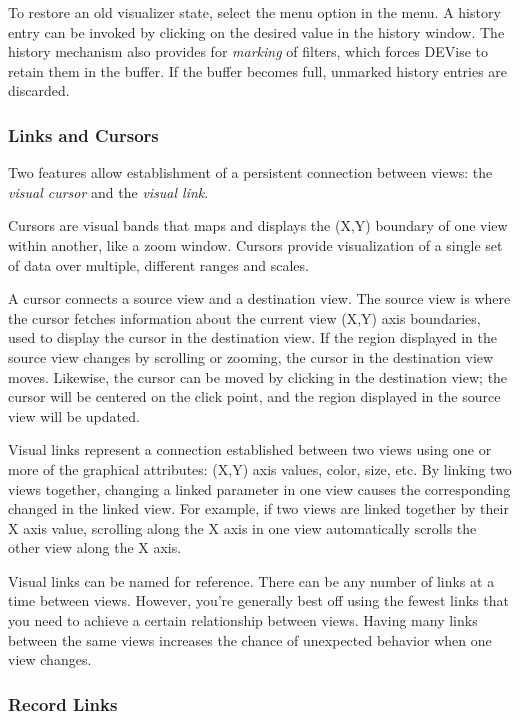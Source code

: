 To restore an old visualizer state, select the  menu option in the
 menu. A history entry can be invoked by clicking on the desired
value in the history window. The history mechanism also provides for {\em
marking} of filters, which forces DEVise to retain them in the buffer. If the
buffer becomes full, unmarked history entries are discarded.

\subsubsection{Links and Cursors}

Two features allow establishment of a persistent connection between views: the
{\em visual cursor} and the {\em visual link}.

Cursors are visual bands that maps and displays the (X,Y) boundary of one view
within another, like a zoom window. Cursors provide visualization of a single set of data over multiple, different ranges and scales.

A cursor connects a source view and a destination view. The source view is
where the cursor fetches information about the current view (X,Y) axis
boundaries, used to display the cursor in the destination view. If the region displayed in the source view changes by scrolling or zooming, the cursor in the destination view moves. Likewise, the cursor can be moved by clicking in the destination view; the cursor will be centered on the click point, and the region displayed in the source view will be updated.

Visual links represent a connection established between two views using one or
more of the graphical attributes: (X,Y) axis values, color, size, etc. By
linking two views together, changing a linked parameter in one view causes the
corresponding changed in the linked view. For example, if two views are linked
together by their X axis value, scrolling along the X axis in one view
automatically scrolls the other view along the X axis.

Visual links can be named for reference. There can be any number of links at a
time between views.  However, you're generally best off using the fewest links
that you need to achieve a certain relationship between views.  Having many
links between the same views increases the chance of unexpected behavior
when one view changes.

\subsubsection{Record Links}

